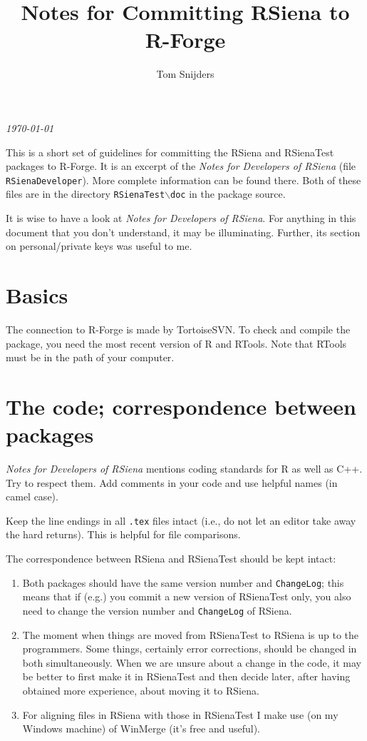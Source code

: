 \documentclass[12pt, a4paper]{article}
\renewcommand{\=}{\,=\,}
\newcommand{\+}{\,+\,}
\newcommand{\bs}{\backslash}
\newcommand{\rs}{{\sf RSiena}}
\newcommand{\RS}{{\sf RSiena }}
\newcommand{\RST}{{\sf RSienaTest }}
\begin{document}
\title{\vspace*{-0.5cm} Notes for Committing RSiena to R-Forge}
\author{Tom Snijders}
\date{}
\maketitle

\centerline{\emph{\today}}
\bigskip

This is a short set of guidelines for committing the RSiena and RSienaTest packages
to R-Forge. It is an excerpt of the \emph{Notes for Developers of RSiena}
(file \texttt{RSienaDeveloper}). More complete information can be found there.
Both of these files are in the directory \texttt{RSienaTest{$\bs$}doc}
in the package source.

It is wise to have a look at \emph{Notes for Developers of RSiena}.
For anything in this document that you don't understand, it may be illuminating.
Further, its section on personal/private keys was useful to me.


\section{Basics}

The connection to R-Forge is made by TortoiseSVN.
To check and compile the package, you need the most recent version of R
and RTools. Note that RTools must be in the path of your computer.

\section{The code; correspondence between packages}

\emph{Notes for Developers of RSiena} mentions coding standards for R as well as C++.
Try to respect them.
Add comments in your code and use helpful names (in camel case).

Keep the line endings in all \texttt{.tex} files intact (i.e., do not let
an editor take away the hard returns). This is helpful for file comparisons.

The correspondence between \RS and \RST should be kept intact:
\begin{enumerate}
\item Both packages should have the same version number and \texttt{ChangeLog}; this means that if (e.g.) you commit a new version of \RST only,
     you also need to change the version number and \texttt{ChangeLog} of \rs.
\item The moment when things are moved from \RST to \RS is up to the programmers.
     Some things, certainly error corrections, should be changed in both simultaneously.
     When we are unsure about a change in the code, it may be better to first
     make it in \RST and then decide later, after having obtained more experience,
     about moving it to \rs.
\item For aligning files in \RS with those in \RST I make use (on my Windows machine)
     of WinMerge (it's free and useful).
\end{enumerate}
\end{document}
